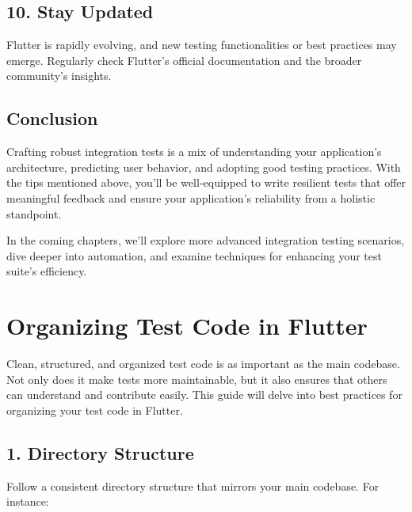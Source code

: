 \documentclass[
]{article}
\begin{document}
\subsection{10. Stay Updated}\label{stay-updated}

Flutter is rapidly evolving, and new testing functionalities or best
practices may emerge. Regularly check Flutter's official documentation
and the broader community's insights.

\subsection{Conclusion}\label{conclusion-10}

Crafting robust integration tests is a mix of understanding your
application's architecture, predicting user behavior, and adopting good
testing practices. With the tips mentioned above, you'll be
well-equipped to write resilient tests that offer meaningful feedback
and ensure your application's reliability from a holistic standpoint.

In the coming chapters, we'll explore more advanced integration testing
scenarios, dive deeper into automation, and examine techniques for
enhancing your test suite's efficiency.

\section{Organizing Test Code in
Flutter}\label{organizing-test-code-in-flutter}

Clean, structured, and organized test code is as important as the main
codebase. Not only does it make tests more maintainable, but it also
ensures that others can understand and contribute easily. This guide
will delve into best practices for organizing your test code in Flutter.

\subsection{1. Directory Structure}\label{directory-structure}

Follow a consistent directory structure that mirrors your main codebase.
For instance:
\end{document}
